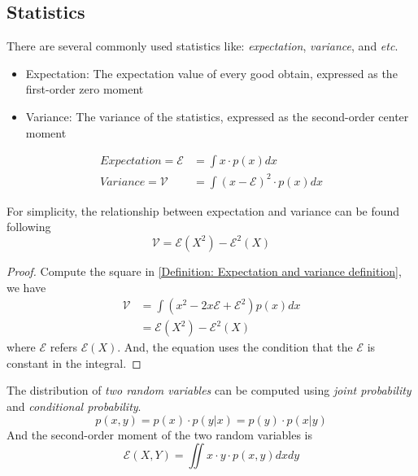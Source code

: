\documentclass[../main.tex]{subfiles}
\begin{document}
\subsection{Statistics}
There are several commonly used statistics like: \emph{expectation}, \emph{variance}, and \textit{etc}.
\begin{itemize}
    \item Expectation: The expectation value of every good obtain, expressed as the first-order zero moment
    \item Variance: The variance of the statistics, expressed as the second-order center moment
\end{itemize}
\begin{equation}
    \label{Definition: Expectation and variance definition}
    \begin{split}
        Expectation = \mathcal{E} & = \int x \cdot p(x) dx                 \\
        Variance = \mathcal{V}    & = \int (x-\mathcal{E})^2 \cdot p(x) dx
    \end{split}
\end{equation}
\begin{lemma}
    \label{Lemma: Relationship between expectation and variance}
    For simplicity, the relationship between expectation and variance can be found following
    \begin{equation*}
        \mathcal{V} = \mathcal{E}(X^2) - \mathcal{E}^2(X)
    \end{equation*}
    \begin{proof}
        Compute the square in \eqref{Definition: Expectation and variance definition},
        we have
        \begin{align*}
            \mathcal{V} & = \int (x^2 - 2 x \mathcal{E} + \mathcal{E}^2) p(x) dx \\
                        & = \mathcal{E}(X^2) - \mathcal{E}^2(X)
        \end{align*}
        where $\mathcal{E}$ refers $\mathcal{E}(X)$.
        And, the equation uses the condition that the $\mathcal{E}$ is constant in the integral.
    \end{proof}
\end{lemma}

The distribution of \emph{two random variables} can be computed using \emph{joint probability} and \emph{conditional probability}.
\begin{equation*}
    p(x, y) = p(x) \cdot p(y|x) = p(y) \cdot p(x|y)
\end{equation*}
And the second-order moment of the two random variables is
\begin{equation*}
    \mathcal{E}(X, Y) = \iint x \cdot y \cdot p(x, y) dx dy
\end{equation*}
\end{document}
